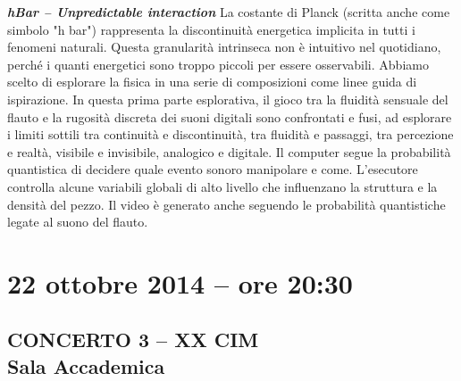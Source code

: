 \documentclass[9pt, twoside, a5paper]{extreport}
\newcommand{\descrizione}[2]{%
\noindent \textbf{\textit{#1}} %
#2 %
\\
}%
\begin{document}
\begin{multicols}{2}
\descrizione{hBar -- Unpredictable interaction}{La costante di Planck (scritta anche come simbolo "h bar") rappresenta la discontinuità energetica implicita in tutti i fenomeni naturali. Questa granularità intrinseca non è intuitivo nel quotidiano, perché i quanti energetici sono troppo piccoli per essere osservabili. Abbiamo scelto di esplorare la fisica in una serie di composizioni come linee guida di ispirazione. In questa prima parte esplorativa, il gioco tra la fluidità sensuale del flauto e la rugosità discreta dei suoni digitali sono confrontati e fusi, ad esplorare i limiti sottili tra continuità e discontinuità, tra fluidità e passaggi, tra percezione e realtà, visibile e invisibile, analogico e digitale. Il computer segue la probabilità quantistica di decidere quale evento sonoro manipolare e come. L'esecutore controlla alcune variabili globali di alto livello che influenzano la struttura e la densità del pezzo. Il video è generato anche seguendo le probabilità quantistiche legate al suono del flauto.}



\end{multicols}

\clearpage



\section*{22 ottobre 2014 -- ore 20:30}
\subsection*{{\small CONCERTO 3 -- XX CIM\\}\textsf{Sala Accademica\\}}
\end{document}
